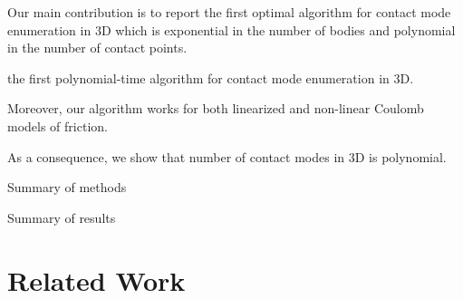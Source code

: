 \documentclass[conference]{IEEEtran}
\newcommand{\TODO}[1]{{\color{red} {{#1}}}}
\begin{document}
\begin{inparaenum}
    \item Our main contribution is to report the first \TODO{optimal}
    algorithm for contact mode enumeration in 3D which is exponential in the
    number of bodies and polynomial in the number of contact points.
    
    the first polynomial-time algorithm for
    contact mode enumeration in 3D.
    \begin{inparaenum}
        \item Moreover, our algorithm works for both linearized and non-linear
        Coulomb models of friction.
        \item As a consequence, we show that number of contact modes in 3D is
        polynomial.
    \end{inparaenum}
    \item Summary of methods
    \item Summary of results
\end{inparaenum}

\section{Related Work}
\end{document}
